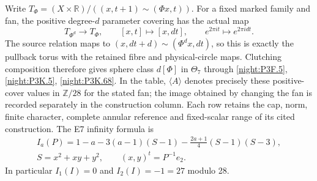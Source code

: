 Write
\(T_\Phi=(X\times\mathbb R)/((x,t+1)\sim(\Phi x,t))\).
For a fixed marked family and fan, the positive degree-\(d\)
parameter covering has the actual map
\[
 T_{\Phi^d}\longrightarrow T_\Phi,
 \qquad [x,t]\longmapsto[x,dt],
 \qquad e^{2\pi it}\longmapsto e^{2\pi idt}.
\]
The source relation maps to
\((x,dt+d)\sim(\Phi^d x,dt)\), so this is exactly the
pullback torus with the retained fibre and physical-circle maps.
Clutching composition therefore gives sphere class \(d[\Phi]\)
in \(\Theta_7\) through \cref{night:P3F.5}, \cref{night:P3K.5}, \cref{night:P3K.68}.
In the table, \(\langle A\rangle\) denotes precisely these
positive-cover values in \(\mathbb Z/28\) for the stated fan;
the image obtained by changing the fan is recorded separately
in the construction column. Each row retains the cap, norm,
finite character, complete annular reference and fixed-scalar
range of its cited construction. The E7 infinity formula is
\[
 \begin{gathered}
 I_a(P)=1-a-3(a-1)(S-1)
       -\frac{2a+1}{4}(S-1)(S-3),\\
 S=x^2+xy+y^2,\qquad (x,y)^t=P^{-1}e_2.
 \end{gathered}
\]
In particular \(I_1(I)=0\) and \(I_2(I)=-1=27\) modulo 28.

